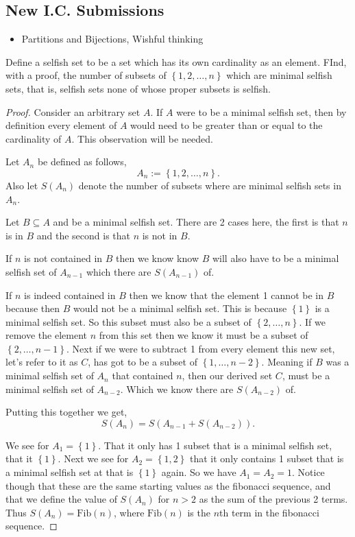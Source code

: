 \documentclass[11pt]{article}
\newenvironment{problem}[2][Problem\!]{\begin{trivlist}
\item[\hskip \labelsep {\bfseries #1}\hskip \labelsep {\bfseries #2}]}{\end{trivlist}}
\newcommand{\set}[1]{\left\{#1\right\}} %
\begin{document}
\subsection{New I.C. Submissions}
\begin{itemize}
    \item[124] Partitions and Bijections, Wishful thinking
\end{itemize}
\begin{tcolorbox}
    \begin{problem}{ IC | 11/05 | 124. (Putnam)}
        Define a selfish set to be a set which has its own cardinality as an element. FInd, with a proof, the number of subsets of $\set{1,2,\dots, n}$ which are minimal selfish sets, that is, selfish sets none of whose proper subsets is selfish. 
    \end{problem}
\end{tcolorbox}
\begin{proof}
    Consider an arbitrary set $A$. If $A$ were to be a minimal selfish set, then by definition every element of $A$ would need to be greater than or equal to the cardinality of $A$. This observation will be needed. 

    Let $A_n$ be defined as follows,
    \[A_n := \set{1,2,\dots, n}.\]
    Also let $S(A_n)$ denote the number of subsets where are minimal selfish sets in $A_n$.


    Let $B \subseteq A$ and be a minimal selfish set. There are 2 cases here, the first is that $n$ is in $B$ and the second is that $n$ is not in $B$.
    
    If $n$ is not contained in $B$ then we know know $B$ will also have to be a minimal selfish set of $A_{n-1}$ which there are $S(A_{n-1})$ of. 

    If $n$ is indeed contained in $B$ then we know that the element 1 cannot be in $B$ because then $B$ would not be a minimal selfish set. This is because $\set{1}$ is a minimal selfish set. So this subset must also be a subset of $\set{2, \dots, n}$. If we remove the element $n$ from this set then we know it must be a subset of $\set{2, \dots, n-1}$. Next if we were to subtract 1 from every element this new set, let's refer to it as $C$, has got to be a subset of $\set{1,\dots,n-2}$. Meaning if $B$ was a minimal selfish set of $A_n$ that contained $n$, then our derived set $C$, must be a minimal selfish set of $A_{n-2}$. Which we know there are $S(A_{n-2})$ of. 
    
    Putting this together we get,
    \[S(A_n) = S(A_{n-1} + S(A_{n-2})).\]

    We see for $A_1 = \set{1}$. That it only has 1 subset that is a minimal selfish set, that it $\set{1}$. Next we see for $A_2 = \set{1,2}$ that it only contains 1 subset that is a minimal selfish set at that is $\set{1}$ again. So we have $A_1 = A_2 = 1$. Notice though that these are the same starting values as the fibonacci sequence, and that we define the value of $S(A_n)$ for $n > 2$ as the sum of the previous 2 terms. Thus $S(A_n) = \text{Fib}(n)$, where $\text{Fib}(n)$ is the $n$th term in the fibonacci sequence. 
\end{proof}
\end{document}
